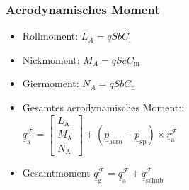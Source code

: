 \documentclass[10pt,a4paper]{article}
\begin{document}
\subsubsection{Aerodynamisches Moment}
\begin{itemize}
\item Rollmoment: $L_A = qSbC_\mathrm{l}$
\item Nickmoment: $M_A = qScC_\mathrm{m}$
\item Giermoment: $N_A = qSbC_\mathrm{n}$
\item Gesamtes aerodynamisches Moment::\\ $\underline{q}^\mathcal{F}_\mathrm{a} = \begin{bmatrix} 
L_\mathrm{A}\\
M_\mathrm{A}\\
N_\mathrm{A}
\end{bmatrix} + (\underline{p}_\mathrm{aero}-\underline{p}_\mathrm{sp})\times\underline{r}^\mathcal{F}_\mathrm{a}$
\item Gesamtmoment $\underline{q}^\mathcal{F}_\mathrm{g} = \underline{q}^\mathcal{F}_\mathrm{a} + \underline{q}^\mathcal{F}_\mathrm{schub} $
\end{itemize}
\end{document}
